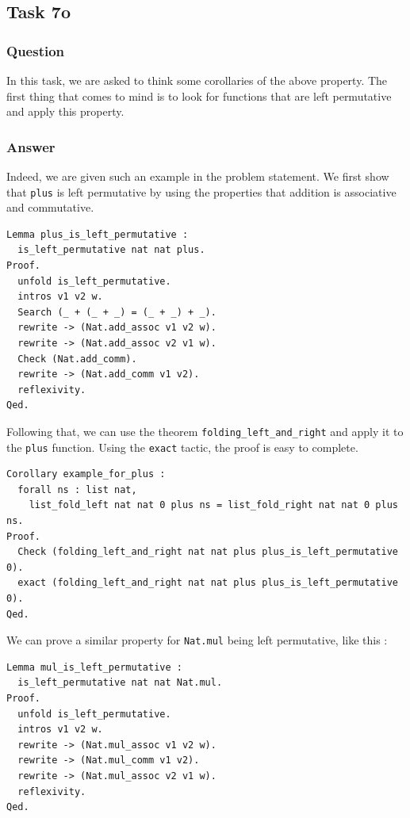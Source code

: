 \documentclass{article}
\begin{document}
\subsection{Task 7o}

\subsubsection{Question}
In this task, we are asked to think some corollaries of the above property. The first thing that comes to mind is to look for functions that are left permutative and apply this property.

\subsubsection{Answer}

Indeed, we are given such an example in the problem statement. We first show that \texttt{plus} is left permutative by using the properties that addition is associative and commutative. 

\begin{lstlisting}
Lemma plus_is_left_permutative :
  is_left_permutative nat nat plus.
Proof.
  unfold is_left_permutative.
  intros v1 v2 w.
  Search (_ + (_ + _) = (_ + _) + _).
  rewrite -> (Nat.add_assoc v1 v2 w).
  rewrite -> (Nat.add_assoc v2 v1 w).
  Check (Nat.add_comm).
  rewrite -> (Nat.add_comm v1 v2).
  reflexivity.
Qed.
\end{lstlisting}

Following that, we can use the theorem \texttt{folding\_left\_and\_right} and apply it to the \texttt{plus} function. Using the \texttt{exact} tactic, the proof is easy to complete.

\begin{lstlisting}
Corollary example_for_plus :
  forall ns : list nat,
    list_fold_left nat nat 0 plus ns = list_fold_right nat nat 0 plus ns.
Proof.
  Check (folding_left_and_right nat nat plus plus_is_left_permutative 0).
  exact (folding_left_and_right nat nat plus plus_is_left_permutative 0).
Qed.
\end{lstlisting}

We can prove a similar property for \texttt{Nat.mul} being left permutative, like this :

\begin{lstlisting}
Lemma mul_is_left_permutative :
  is_left_permutative nat nat Nat.mul.
Proof.
  unfold is_left_permutative.
  intros v1 v2 w.
  rewrite -> (Nat.mul_assoc v1 v2 w).
  rewrite -> (Nat.mul_comm v1 v2).
  rewrite -> (Nat.mul_assoc v2 v1 w).
  reflexivity.
Qed.
\end{lstlisting}
\end{document}
